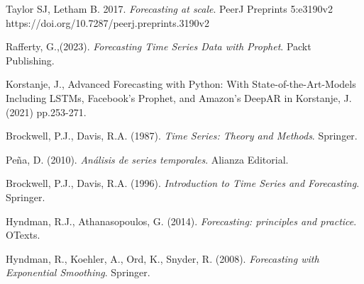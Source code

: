 \documentclass[12pt,twoside]{article}
\begin{document}
\newpage
{}
\begin{thebibliography}{100}


 Taylor SJ, Letham B. 2017. \textit{Forecasting at scale}. PeerJ Preprints 5:e3190v2 https://doi.org/10.7287/peerj.preprints.3190v2

 Rafferty, G.,(2023).
\textit{Forecasting Time Series Data with Prophet}. Packt Publishing.  

 Korstanje, J., Advanced Forecasting with Python: With State-of-the-Art-Models Including LSTMs, Facebook’s Prophet, and Amazon’s DeepAR in Korstanje, J. (2021) pp.253-271.

 Brockwell, P.J., Davis, R.A.  (1987).
\textit{Time Series: Theory and Methods}. Springer.

 Peña, D.  (2010).
\textit{Análisis de series temporales}. Alianza Editorial.

 Brockwell, P.J., Davis, R.A.  (1996).
\textit{Introduction to Time Series and Forecasting}. Springer.


 Hyndman, R.J., Athanasopoulos, G.  (2014).
\textit{Forecasting: principles and practice}. OTexts.

 Hyndman, R., Koehler, A., Ord, K., Snyder, R.  (2008).
\textit{Forecasting with Exponential Smoothing}. Springer.

















\end{thebibliography}
\end{document}

